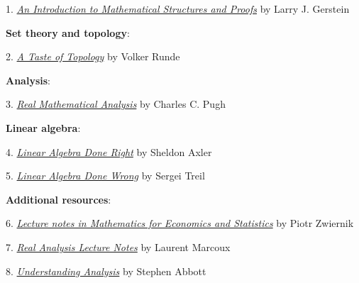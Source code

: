 \documentclass[12pt]{article}
\begin{document}
1. \href{https://link-springer-com.myaccess.library.utoronto.ca/book/10.1007/978-1-4614-4265-3}{{\emph{An Introduction to Mathematical Structures and Proofs}}} by Larry J. Gerstein

\vspace{1em}

\noindent
{\bf{Set theory and topology}}:
\vspace{0.1cm}

2. \href{https://link-springer-com.myaccess.library.utoronto.ca/book/10.1007/0-387-28387-0}{\emph{A Taste of Topology}} by Volker Runde

\vspace{1em}


\noindent
{\bf{Analysis}}:
\vspace{0.1cm}


3. \href{https://link-springer-com.myaccess.library.utoronto.ca/book/10.1007/978-3-319-17771-7}{\emph{Real Mathematical Analysis}} by Charles C. Pugh

\vspace{1em}

\noindent
{\bf{Linear algebra}}:

\vspace{0.1cm}

4. \href{https://link-springer-com.myaccess.library.utoronto.ca/book/10.1007/978-3-319-11080-6}{{\emph{Linear Algebra Done Right}}} by Sheldon Axler

5. \href{https://www.math.brown.edu/streil/papers/LADW/LADW.html}{{\emph{Linear Algebra Done Wrong}}} by Sergei Treil

\vspace{1em}

\noindent
{\bf{Additional resources}}:
\vspace{0.1cm}

6. \href{http://84.89.132.1/~piotr/docs/RealAnalysisNotes.pdf}{\emph{Lecture notes in Mathematics for Economics and Statistics}} by Piotr Zwiernik

7. \href{http://www.math.uwaterloo.ca/~lwmarcou/notes/pmath351.pdf}{{\emph{Real Analysis Lecture Notes}}} by Laurent Marcoux

8.  \href{https://link-springer-com.myaccess.library.utoronto.ca/book/10.1007/978-1-4939-2712-8}{{\emph{Understanding Analysis}}} by Stephen Abbott
\end{document}
